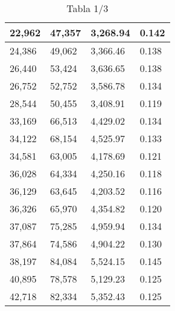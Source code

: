 \begin{table}[H]
{\begin{tabular}{| l | l | l |l |}
22,962	&	47,357	&	3,268.94	&	0.142	\\ \hline
24,386	&	49,062	&	3,366.46	&	0.138	\\ \hline
26,440	&	53,424	&	3,636.65	&	0.138	\\ \hline
26,752	&	52,752	&	3,586.78	&	0.134	\\ \hline
28,544	&	50,455	&	3,408.91	&	0.119	\\ \hline
33,169	&	66,513	&	4,429.02	&	0.134	\\ \hline
34,122	&	68,154	&	4,525.97	&	0.133	\\ \hline
34,581	&	63,005	&	4,178.69	&	0.121	\\ \hline
36,028	&	64,334	&	4,250.16	&	0.118	\\ \hline
36,129	&	63,645	&	4,203.52	&	0.116	\\ \hline
36,326	&	65,970	&	4,354.82	&	0.120	\\ \hline
37,087	&	75,285	&	4,959.94	&	0.134	\\ \hline
37,864	&	74,586	&	4,904.22	&	0.130	\\ \hline
38,197	&	84,084	&	5,524.15	&	0.145	\\ \hline
40,895	&	78,578	&	5,129.23	&	0.125	\\ \hline
42,718	&	82,334	&	5,352.43	&	0.125	\\ \hline

  \end{tabular}
   \caption*{Tabla 1/3}
}
\end{table}
